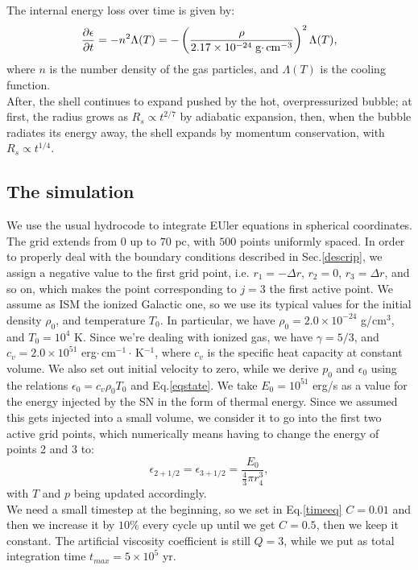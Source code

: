 \documentclass{article}
\begin{document}
The internal energy loss over time is given by:
\begin{equation}
	\pdv{\epsilon}{t}= -n^2\Lambda(T)=-\left(\frac{\rho}{2.17\times 10^{-24}\;\text{g$\cdot\,$cm}^{-3}}\right)^2\Lambda(T),
\end{equation}
where $n$ is the number density of the gas particles, and $\Lambda(T)$ is the cooling function. \\
After, the shell continues to expand pushed by the hot, overpressurized bubble; at first, the radius grows as $R_s\propto t^{2/7}$ by adiabatic expansion, then, when the bubble radiates its energy away, the shell expands by momentum conservation, with $R_s\propto t^{1/4}$.

\subsection{The simulation}
We use the usual hydrocode to integrate EUler equations in spherical coordinates. The grid extends from $0$ up to $70$ pc, with $500$ points uniformly spaced. In order to properly deal with the boundary conditions described in Sec.\ref{descrip}, we assign a negative value to the first grid point, i.e. $r_1=-\Delta r$, $r_2=0$, $r_3=\Delta r$, and so on, which makes the point corresponding to $j=3$ the first active point. 
We assume as ISM the ionized Galactic one, so we use its typical values for the initial density $\rho_0$, and temperature $T_0$. In particular, we have $\rho_0=2.0\times 10^{-24}$ g/cm$^{3}$, and $T_0=10^4$ K. Since we're dealing with ionized gas, we have $\gamma =5/3$, and $c_v=2.0\times 10^{51}$ erg$\cdot\,$cm$^{-1}\cdot\,$K$^{-1}$, where $c_v$ is the specific heat capacity at constant volume. We also set out initial velocity to zero, while we derive $p_0$ and $\epsilon_0$ using the relations $\epsilon_0=c_v\rho_0T_0$ and Eq.\eqref{eqstate}. We take $E_0=10^{51}$ erg/s as a value for the energy injected by the SN in the form of thermal energy. Since we assumed this gets injected into a small volume, we consider it to go into the first two active grid points, which numerically means having to change the energy of points 2 and 3 to:
\begin{equation}
	\epsilon_{2+1/2}=\epsilon_{3+1/2}=\frac{E_0}{\frac{4}{3}\pi r_4^3},
\end{equation}
with $T$ and $p$ being updated accordingly.\\
We need a small timestep at the beginning, so we set in Eq.\eqref{timeeq} $C=0.01$ and then we increase it by $10\%$ every cycle up until we get $C=0.5$, then we keep it constant. The artificial viscosity coefficient is still $Q=3$, while we put as total integration time $t_{max}=5\times 10^5$ yr. 
\end{document}
